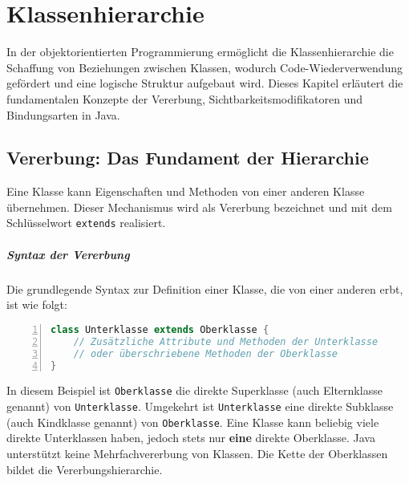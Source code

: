 \chapter{Klassenhierarchie}
\label{chap:klassenhierarchie}

In der objektorientierten Programmierung ermöglicht die Klassenhierarchie die Schaffung von Beziehungen zwischen Klassen, 
wodurch Code-Wiederverwendung gefördert und eine logische Struktur aufgebaut wird. Dieses Kapitel erläutert die fundamentalen 
Konzepte der Vererbung, Sichtbarkeitsmodifikatoren und Bindungsarten in Java.

\section{Vererbung: Das Fundament der Hierarchie}
\label{sec:erben}

Eine Klasse kann Eigenschaften und Methoden von einer anderen Klasse übernehmen. Dieser Mechanismus wird als Vererbung bezeichnet 
und mit dem Schlüsselwort \texttt{extends} realisiert.

\paragraph{Syntax der Vererbung}
Die grundlegende Syntax zur Definition einer Klasse, die von einer anderen erbt, ist wie folgt:
\begin{lstlisting}[language=Java, caption={Deklaration einer abgeleiteten Klasse}, label=lst:erben_syntax, basicstyle=\ttfamily\footnotesize, breaklines=true, frame=tb, numbers=left]
class Unterklasse extends Oberklasse {
    // Zusätzliche Attribute und Methoden der Unterklasse
    // oder überschriebene Methoden der Oberklasse
}
\end{lstlisting}
In diesem Beispiel ist \texttt{Oberklasse} die direkte Superklasse (auch Elternklasse genannt) von \texttt{Unterklasse}. Umgekehrt ist 
\texttt{Unterklasse} eine direkte Subklasse (auch Kindklasse genannt) von \texttt{Oberklasse}. Eine Klasse kann beliebig viele direkte 
Unterklassen haben, jedoch stets nur \textbf{eine} direkte Oberklasse. Java unterstützt keine Mehrfachvererbung von Klassen. Die Kette 
der Oberklassen bildet die Vererbungshierarchie.

